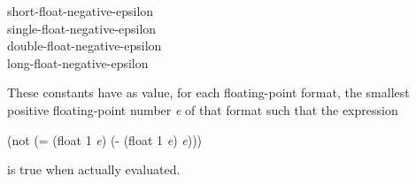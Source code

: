 \begin{defun}[Constant]
short-float-negative-epsilon \\
single-float-negative-epsilon \\
double-float-negative-epsilon \\
long-float-negative-epsilon

These constants have as value, for each floating-point format,
the smallest positive floating-point number \emph{e} of that format such that
the expression
\begin{lisp}
(not (= (float 1 \emph{e}) (- (float 1 \emph{e}) \emph{e})))
\end{lisp}
is true when actually evaluated.
\end{defun}

\endgroup
